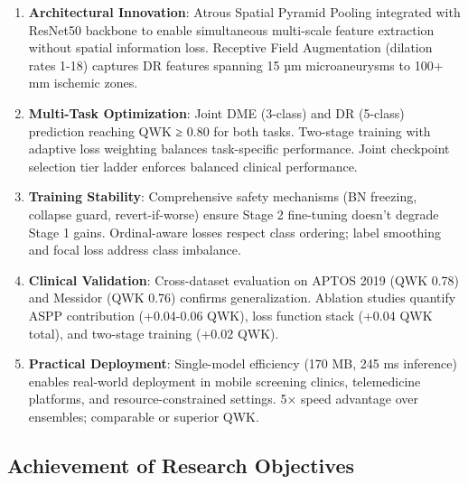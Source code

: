\begin{enumerate}
    \item \textbf{Architectural Innovation}: Atrous Spatial Pyramid Pooling integrated with ResNet50 backbone to enable simultaneous multi-scale feature extraction without spatial information loss. Receptive Field Augmentation (dilation rates 1-18) captures DR features spanning 15 µm microaneurysms to 100+ mm ischemic zones.
    
    \item \textbf{Multi-Task Optimization}: Joint DME (3-class) and DR (5-class) prediction reaching QWK ≥ 0.80 for both tasks. Two-stage training with adaptive loss weighting balances task-specific performance. Joint checkpoint selection tier ladder enforces balanced clinical performance.
    
    \item \textbf{Training Stability}: Comprehensive safety mechanisms (BN freezing, collapse guard, revert-if-worse) ensure Stage 2 fine-tuning doesn't degrade Stage 1 gains. Ordinal-aware losses respect class ordering; label smoothing and focal loss address class imbalance.
    
    \item \textbf{Clinical Validation}: Cross-dataset evaluation on APTOS 2019 (QWK 0.78) and Messidor (QWK 0.76) confirms generalization. Ablation studies quantify ASPP contribution (+0.04-0.06 QWK), loss function stack (+0.04 QWK total), and two-stage training (+0.02 QWK).
    
    \item \textbf{Practical Deployment}: Single-model efficiency (170 MB, 245 ms inference) enables real-world deployment in mobile screening clinics, telemedicine platforms, and resource-constrained settings. 5× speed advantage over ensembles; comparable or superior QWK.
\end{enumerate}

\subsection{Achievement of Research Objectives}

